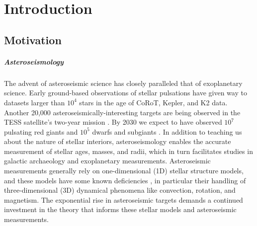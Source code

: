 \chapter{Introduction}
\label{introchap}

\section{Motivation}

\paragraph{Asteroseismology}
\label{sct:asteroseismology}
The advent of asteroseismic science has closely paralleled that of exoplanetary science.
Early ground-based observations of stellar pulsations \cite[e.g.,][]{kjeldsen&frandsen1991, bouchy&carrier2001, bedding&all2001} have given way to datasets larger than $10^4$ stars \cite[e.g.,][]{yu&all2018, santos&all2019b} in the age of CoRoT, Kepler, and K2 data.
Another 20,000 asteroseismically-interesting targets are being observed in the TESS satellite's two-year mission \cite{schofield&all2019}.
By 2030 we expect to have observed $10^7$ pulsating red giants and $10^5$ dwarfs and subgiants \cite{huber&all2019}.
In addition to teaching us about the nature of stellar interiors, asteroseismology enables the accurate measurement of stellar ages, masses, and radii, which in turn facilitates studies in galactic archaeology and exoplanetary measurements.
Asteroseismic measurements generally rely on one-dimensional (1D) stellar structure models, and these models have some known deficiencies \cite{buldgen2019}, in particular their handling of three-dimensional (3D) dynamical phenomena like convection, rotation, and magnetism.
The exponential rise in asteroseismic targets demands a continued investment in the theory that informs these stellar models and asteroseismic measurements.

